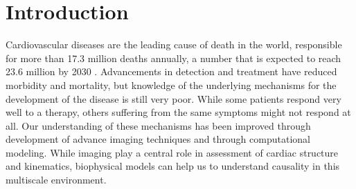 \chapter{Introduction}








Cardiovascular diseases are the leading cause of death in the
world, responsible for more than 17.3 million deaths annually, a
number that is expected to reach 23.6 million by 2030
\cite{writing2016heart}. Advancements in detection and treatment
have reduced morbidity and mortality, but knowledge of the underlying
mechanisms for the development of the disease is still very poor.
While some patients respond very well to a therapy, others suffering
from the same symptoms might not respond at all.
Our understanding of these mechanisms has been improved through
development of advance imaging techniques and through
computational modeling. While imaging play a central role in
assessment of cardiac structure and kinematics, biophysical models can
help us to understand causality in this multiscale environment.  


